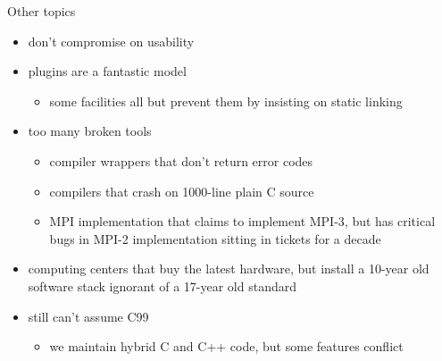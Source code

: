 \documentclass{beamer}
\begin{document}
\begin{frame}{Other topics}
  \begin{itemize}
  \item don't compromise on usability
  \item plugins are a fantastic model
    \begin{itemize}
    \item some facilities all but prevent them by insisting on static linking
    \end{itemize}
  \item too many broken tools
    \begin{itemize}
    \item compiler wrappers that don't return error codes
    \item compilers that crash on 1000-line plain C source
    \item MPI implementation that claims to implement MPI-3, but has critical bugs in MPI-2 implementation sitting in tickets for a decade
    \end{itemize}
  \item computing centers that buy the latest hardware, but install a 10-year old software stack ignorant of a 17-year old standard
  \item still can't assume C99
    \begin{itemize}
    \item we maintain hybrid C and C++ code, but some features conflict
    \end{itemize}
  \end{itemize}
\end{frame}
\end{document}
